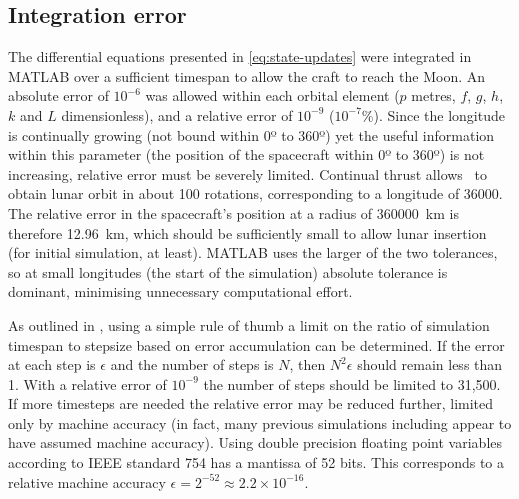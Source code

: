 
\subsection{Integration error} \label{sub:Integration-error}

The differential equations presented in \autoref{eq:state-updates} were integrated in MATLAB over a sufficient timespan to allow the craft to reach the Moon. An absolute error of $10^{-6}$ was allowed within each orbital element ($p$ metres, $f$, $g$, $h$, $k$ and $L$ dimensionless), and a relative error of $10^{-9}$ ($10^{-7}$\%). Since the longitude is continually growing (not bound within 0º to 360º) yet the useful information within this parameter (the position of the spacecraft within 0º to 360º) is not increasing, relative error must be severely limited. Continual thrust allows \BW\ to obtain lunar orbit in about 100 rotations, corresponding to a longitude of 36000\degrees. The relative error in the spacecraft's position at a radius of 360000~km is therefore 12.96~km, which should be sufficiently small to allow lunar insertion (for initial simulation, at least). MATLAB uses the larger of the two tolerances, so at small longitudes (the start of the simulation) absolute tolerance is dominant, minimising unnecessary computational effort.

As outlined in \textcite{Milani1987}, using a simple rule of thumb a limit on the ratio of simulation timespan to stepsize based on error accumulation can be determined. If the error at each step is $\epsilon$ and the number of steps is $N$, then $N^{2}\epsilon$ should remain less than 1. With a relative error of $10^{-9}$ the number of steps should be limited to 31,500. If more timesteps are needed the relative error may be reduced further, limited only by machine accuracy (in fact, many previous simulations including \citeauthor{Milani1987} appear to have assumed machine accuracy). Using double precision floating point variables according to IEEE standard 754 has a mantissa of 52 bits. This corresponds to a relative machine accuracy $\epsilon=2^{-52}\approx2.2\times10^{-16}$.

